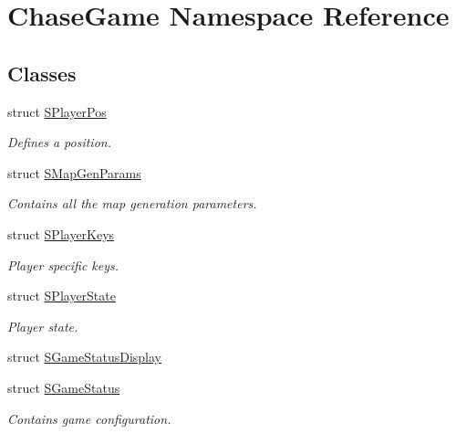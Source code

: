 \hypertarget{namespace_chase_game}{\section{Chase\-Game Namespace Reference}
\label{namespace_chase_game}
}
\subsection*{Classes}
\begin{DoxyCompactItemize}
\item 
struct \hyperlink{struct_chase_game_1_1_s_player_pos}{S\-Player\-Pos}
\begin{DoxyCompactList}\small\item\em Defines a position. \end{DoxyCompactList}\item 
struct \hyperlink{struct_chase_game_1_1_s_map_gen_params}{S\-Map\-Gen\-Params}
\begin{DoxyCompactList}\small\item\em Contains all the map generation parameters. \end{DoxyCompactList}\item 
struct \hyperlink{struct_chase_game_1_1_s_player_keys}{S\-Player\-Keys}
\begin{DoxyCompactList}\small\item\em Player specific keys. \end{DoxyCompactList}\item 
struct \hyperlink{struct_chase_game_1_1_s_player_state}{S\-Player\-State}
\begin{DoxyCompactList}\small\item\em Player state. \end{DoxyCompactList}\item 
struct \hyperlink{struct_chase_game_1_1_s_game_status_display}{S\-Game\-Status\-Display}
\item 
struct \hyperlink{struct_chase_game_1_1_s_game_status}{S\-Game\-Status}
\begin{DoxyCompactList}\small\item\em Contains game configuration. \end{DoxyCompactList}\end{DoxyCompactItemize}
